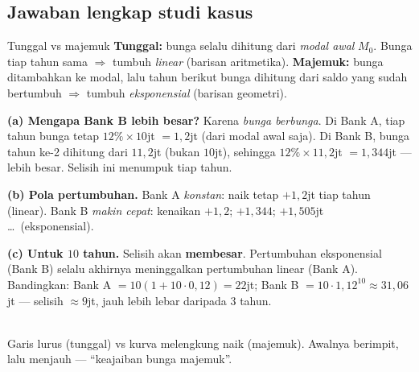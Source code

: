 \subsection*{Jawaban lengkap studi kasus}

\begin{ingat}{Tunggal vs majemuk}
\textbf{Tunggal:} bunga selalu dihitung dari \emph{modal awal} $M_0$. Bunga tiap
tahun sama $\Rightarrow$ tumbuh \emph{linear} (barisan aritmetika).
\textbf{Majemuk:} bunga ditambahkan ke modal, lalu tahun berikut bunga dihitung
dari saldo yang sudah bertumbuh $\Rightarrow$ tumbuh \emph{eksponensial}
(barisan geometri).
\end{ingat}

\textbf{(a) Mengapa Bank B lebih besar?} Karena \emph{bunga berbunga}. Di Bank A,
tiap tahun bunga tetap $12\%\times10$jt $=1{,}2$jt (dari modal awal saja). Di
Bank B, bunga tahun ke-2 dihitung dari $11{,}2$jt (bukan $10$jt), sehingga
$12\%\times11{,}2$jt $=1{,}344$jt --- lebih besar. Selisih ini menumpuk tiap
tahun.

\textbf{(b) Pola pertumbuhan.} Bank A \emph{konstan}: naik tetap $+1{,}2$jt tiap
tahun (linear). Bank B \emph{makin cepat}: kenaikan $+1{,}2$; $+1{,}344$;
$+1{,}505$jt \dots\ (eksponensial).

\textbf{(c) Untuk $10$ tahun.} Selisih akan \textbf{membesar}. Pertumbuhan
eksponensial (Bank B) selalu akhirnya meninggalkan pertumbuhan linear (Bank A).
Bandingkan: Bank A $=10(1+10\cdot0{,}12)=22$jt; Bank B
$=10\cdot1{,}12^{10}\approx31{,}06$jt --- selisih $\approx9$jt, jauh lebih lebar
daripada $3$ tahun.

\begin{center}
\\
{\small Garis lurus (tunggal) vs kurva melengkung naik (majemuk). Awalnya
berimpit, lalu menjauh --- ``keajaiban bunga majemuk''.}
\end{center}

